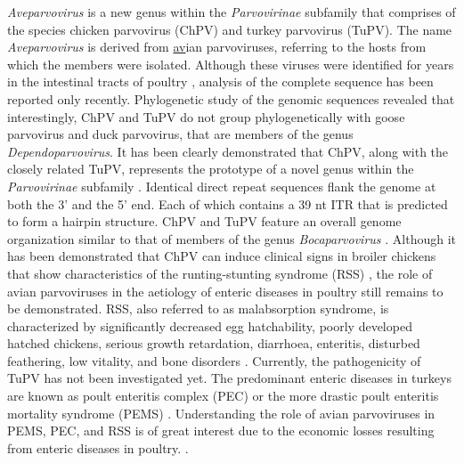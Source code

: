 \textit{Aveparvovirus} is a new genus within the \textit{Parvovirinae} subfamily that comprises of the species chicken parvovirus (ChPV) and turkey parvovirus (TuPV). The name \textit{Aveparvovirus} is derived from \underline{av}ian parvoviruses, referring to the hosts from which the members were isolated. Although these viruses were identified for years in the intestinal tracts of poultry \cite{pmid18766849, pmid6847550, pmid2995561}, analysis of the complete sequence has been reported only recently. Phylogenetic study of the genomic sequences revealed that interestingly, ChPV and TuPV do not group phylogenetically with goose parvovirus and duck parvovirus, that are members of the genus \textit{Dependoparvovirus}. It has been clearly demonstrated that ChPV, along with the closely related TuPV, represents the prototype of a novel genus within the \textit{Parvovirinae} subfamily \cite{pmid25510852, pmid18622862}. Identical direct repeat sequences flank the genome at both the 3' and the 5' end. Each of which contains a 39 nt ITR that is predicted to form a hairpin structure. ChPV and TuPV feature an overall genome organization similar to that of members of the genus \textit{Bocaparvovirus} \cite{pmid20097398}. 
Although it has been demonstrated that ChPV can induce clinical signs in broiler chickens that show characteristics of the runting-stunting syndrome (RSS) \cite{pmid18766892}, the role of avian parvoviruses in the aetiology of enteric diseases in poultry still remains to be demonstrated. RSS, also referred to as malabsorption syndrome, is characterized by significantly decreased egg hatchability, poorly developed hatched chickens, serious growth retardation, diarrhoea, enteritis, disturbed feathering, low vitality, and bone disorders \cite{pmid7150147, pmid6281962, pmid8363509}. Currently, the pathogenicity of TuPV has not been investigated yet. The predominant enteric diseases in turkeys are known as poult enteritis complex (PEC) \cite{pmid10935280} or the more drastic poult enteritis mortality syndrome (PEMS) \cite{PEMS}. Understanding the role of avian parvoviruses in PEMS, PEC, and RSS is of great interest due to the economic losses resulting from enteric diseases in poultry. \cite{pmid18622862}. 
  
    





